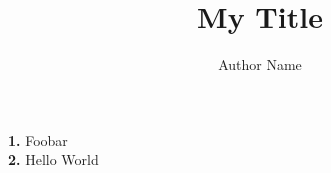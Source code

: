 \documentclass[12pt,a4paper]{article}
\begin{document}
\title{My Title}
\author{Author Name}

\begin{center}
    \makeatletter
    \textbf{\@title}
    \par
    \@author
    \vspace{1cm}
\end{center}
\makeatother

{\setlength{\parindent}{0cm}

\textbf{1.} Foobar
\\
\textbf{2.} Hello World

}
\end{document}

